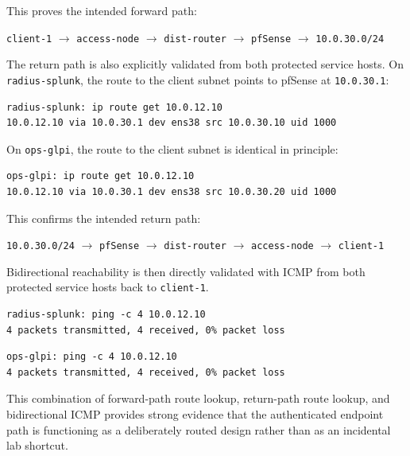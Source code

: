 \documentclass[11pt]{article}
\begin{document}
This proves the intended forward path:

\begin{center}
\texttt{client-1} $\rightarrow$ \texttt{access-node} $\rightarrow$ \texttt{dist-router} $\rightarrow$ \texttt{pfSense} $\rightarrow$ \texttt{10.0.30.0/24}
\end{center}

The return path is also explicitly validated from both protected service hosts. On \texttt{radius-splunk}, the route to the client subnet points to pfSense at \texttt{10.0.30.1}:

\begin{verbatim}
radius-splunk: ip route get 10.0.12.10
10.0.12.10 via 10.0.30.1 dev ens38 src 10.0.30.10 uid 1000
\end{verbatim}

On \texttt{ops-glpi}, the route to the client subnet is identical in principle:

\begin{verbatim}
ops-glpi: ip route get 10.0.12.10
10.0.12.10 via 10.0.30.1 dev ens38 src 10.0.30.20 uid 1000
\end{verbatim}

This confirms the intended return path:

\begin{center}
\texttt{10.0.30.0/24} $\rightarrow$ \texttt{pfSense} $\rightarrow$ \texttt{dist-router} $\rightarrow$ \texttt{access-node} $\rightarrow$ \texttt{client-1}
\end{center}

Bidirectional reachability is then directly validated with ICMP from both protected service hosts back to \texttt{client-1}.

\begin{verbatim}
radius-splunk: ping -c 4 10.0.12.10
4 packets transmitted, 4 received, 0% packet loss
\end{verbatim}

\begin{verbatim}
ops-glpi: ping -c 4 10.0.12.10
4 packets transmitted, 4 received, 0% packet loss
\end{verbatim}

This combination of forward-path route lookup, return-path route lookup, and bidirectional ICMP provides strong evidence that the authenticated endpoint path is functioning as a deliberately routed design rather than as an incidental lab shortcut.

\end{document}
